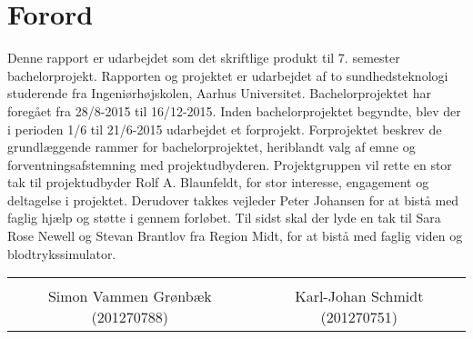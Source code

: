 \chapter*{Forord}

Denne rapport er udarbejdet som det skriftlige produkt til 7. semester bachelorprojekt. Rapporten og projektet er udarbejdet af to sundhedsteknologi studerende fra Ingeniørhøjskolen, Aarhus Universitet. Bachelorprojektet har foregået fra 28/8-2015 til 16/12-2015. Inden bachelorprojektet begyndte, blev der i perioden 1/6 til 21/6-2015 udarbejdet et forprojekt. Forprojektet beskrev de grundlæggende rammer for bachelorprojektet, heriblandt valg af emne og forventningsafstemning med projektudbyderen. 
Projektgruppen vil rette en stor tak til projektudbyder Rolf A. Blaunfeldt, for stor interesse, engagement og deltagelse i projektet. Derudover takkes vejleder Peter Johansen for at bistå med faglig hjælp og støtte i gennem forløbet. Til sidst skal der lyde en tak til Sara Rose Newell og Stevan Brantlov fra Region Midt, for at bistå med faglig viden og blodtrykssimulator. 

\vspace{3cm}

\begin{table}[H]
	\centering
	\begin{tabular}{c c}
		\underline{\phantom{mmmmmmmmmmmmmmmmmmmmm}} & \underline{\phantom{mmmmmmmmmmmmmmmmmmmmm}} \\
		Simon Vammen Grønbæk (201270788) \vspace{2cm} & Karl-Johan Schmidt (201270751) \vspace{2cm}\\
	\end{tabular}
\end{table}